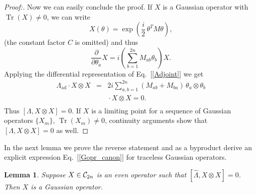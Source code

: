 \documentclass[twocolumn,showpacs,preprintnumbers,superscriptaddress]{revtex4}
\newtheorem{lemma}{Lemma}
\newcommand{\Clif}{{\cal C}}
\newcommand{\drv}[1]{\frac{\partial}{\partial{#1}}}
\newcommand{\ad}{{\mathrm{ad}}}
\newcommand{\nn}{\nonumber}
\newcommand{\Lop}{{\hat{\Lambda}}}
\DeclareMathOperator*{\tr}{\mathop{\mathrm{Tr}}}
\begin{document}
\begin{proof}[Proof:]
Now we can easily conclude the proof. If $X$ is a Gaussian operator with 
$\tr(X)\ne 0$, we can write
\[
X(\theta)=\exp{\left( \frac{i}2\, \theta^T M \theta \right) },
\]
(the constant factor $C$ is omitted) and thus
\[
\drv{\theta_a}X  = i\left( \sum_{b=1}^{2n} M_{ab} \theta_b \right) X.
\]
Applying the differential representation of Eq.~[\ref{Adjoint}] we get
\begin{eqnarray}\nn
\Lambda_{\ad}\cdot X\otimes X &=&
2i \sum_{a,b=1}^{2n} (M_{ab} + M_{ba})\, \theta_a\otimes \theta_b \nn \\
&& {} \cdot X\otimes X =0. \nn \\
\end{eqnarray}
Thus $[\Lambda,X\otimes X]=0$. If $X$ is a limiting point for a sequence
of Gaussian operators $\{X_m\}$, $\tr(X_m)\ne 0$, continuity arguments show that
$[\Lambda,X\otimes X]=0$ as well.
\end{proof}

In the next lemma we prove the reverse statement and as a byproduct 
derive an explicit expression Eq.~[\ref{Gopr_canon}] for traceless Gaussian operators.
\begin{lemma}\label{lemma:Gopr2}
Suppose $X\in \Clif_{2n}$ is an even operator such that
$[\Lop,X\otimes X]=0$. Then $X$ is a Gaussian operator.
\end{lemma}
\end{document}
